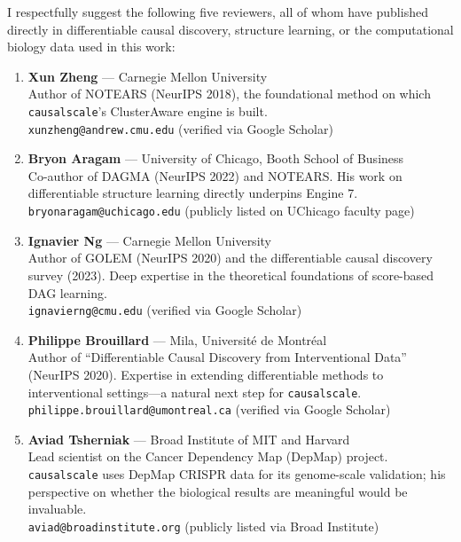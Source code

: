 \documentclass[11pt]{article}
\begin{document}
\medskip


\smallskip

I respectfully suggest the following five reviewers, all of whom have published directly in differentiable causal discovery, structure learning, or the computational biology data used in this work:

\begin{enumerate}[nosep]
\item {\bf Xun Zheng} --- Carnegie Mellon University \\
      Author of NOTEARS (NeurIPS 2018), the foundational method on which \texttt{causalscale}'s ClusterAware engine is built. \\
      \texttt{xunzheng@andrew.cmu.edu} (verified via Google Scholar)

\item {\bf Bryon Aragam} --- University of Chicago, Booth School of Business \\
      Co-author of DAGMA (NeurIPS 2022) and NOTEARS. His work on differentiable structure learning directly underpins Engine 7. \\
      \texttt{bryonaragam@uchicago.edu} (publicly listed on UChicago faculty page)

\item {\bf Ignavier Ng} --- Carnegie Mellon University \\
      Author of GOLEM (NeurIPS 2020) and the differentiable causal discovery survey (2023). Deep expertise in the theoretical foundations of score-based DAG learning. \\
      \texttt{ignavierng@cmu.edu} (verified via Google Scholar)

\item {\bf Philippe Brouillard} --- Mila, Universit\'{e} de Montr\'{e}al \\
      Author of ``Differentiable Causal Discovery from Interventional Data'' (NeurIPS 2020). Expertise in extending differentiable methods to interventional settings---a natural next step for \texttt{causalscale}. \\
      \texttt{philippe.brouillard@umontreal.ca} (verified via Google Scholar)

\item {\bf Aviad Tsherniak} --- Broad Institute of MIT and Harvard \\
      Lead scientist on the Cancer Dependency Map (DepMap) project. \texttt{causalscale} uses DepMap CRISPR data for its genome-scale validation; his perspective on whether the biological results are meaningful would be invaluable. \\
      \texttt{aviad@broadinstitute.org} (publicly listed via Broad Institute)
\end{enumerate}
\end{document}
